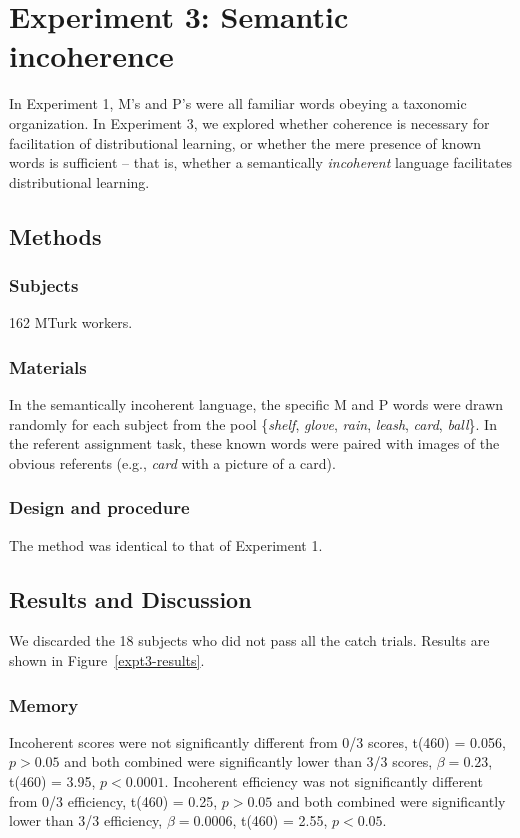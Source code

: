 \documentclass[man,floatsintext]{apa6}
\begin{document}
\section{Experiment 3: Semantic incoherence}

In Experiment 1, M's and P's were all familiar words obeying a taxonomic organization. In Experiment 3, we explored whether coherence is necessary for facilitation of distributional learning, or whether the mere presence of known words is sufficient -- that is, whether a semantically \emph{incoherent} language facilitates distributional learning.

\subsection{Methods}
\subsubsection{Subjects}
162 MTurk workers.

\subsubsection{Materials}
In the semantically incoherent language, the specific M and P words were drawn randomly for each subject from the pool \{\emph{shelf}, \emph{glove}, \emph{rain}, \emph{leash}, \emph{card}, \emph{ball}\}. In the referent assignment task, these known words were paired with images of the obvious referents (e.g., \emph{card} with a picture of a card).

\subsubsection{Design and procedure}  The method was identical to that of Experiment 1.

\subsection{Results and Discussion}
We discarded the 18 subjects who did not pass all the catch trials. Results are shown in Figure~\ref{expt3-results}.

\subsubsection{Memory}
Incoherent scores were not significantly different from 0/3 scores, t(460) = 0.056, $p > 0.05$ and both combined were significantly lower than 3/3 scores, $\beta = 0.23$, t(460) = 3.95, $p < 0.0001$. Incoherent efficiency was not significantly different from 0/3 efficiency, t(460) = 0.25, $p > 0.05$ and both combined were significantly lower than 3/3 efficiency, $\beta = 0.0006$, t(460) = 2.55, $p < 0.05$.
\end{document}
